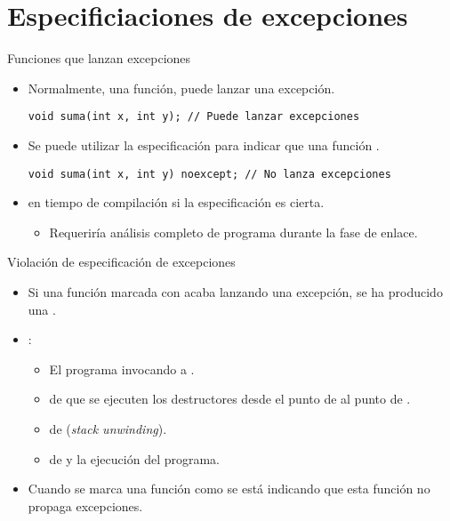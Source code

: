 \section{Especificiaciones de excepciones}

\begin{frame}[t,fragile]{Funciones que lanzan excepciones}
\begin{itemize}
  \item Normalmente, una función, puede lanzar una excepción.
\begin{lstlisting}
void suma(int x, int y); // Puede lanzar excepciones
\end{lstlisting}

  \item Se puede utilizar la especificación  para
        indicar que una función .
\begin{lstlisting}
void suma(int x, int y) noexcept; // No lanza excepciones
\end{lstlisting}

  \item {} en tiempo de compilación 
        si la especificación es cierta.
    \begin{itemize}
      \item Requeriría análisis completo de programa durante la fase de enlace.
    \end{itemize}
\end{itemize}
\end{frame}

\begin{frame}[t,fragile]{Violación de especificación de excepciones}
\begin{itemize}
  \item Si una función marcada con  acaba lanzando una
        excepción, se ha producido una .

  \item {}:
    \begin{itemize}
      \item El programa  invocando a .
      \item {} de que se ejecuten los destructores desde el punto
            de  al punto de .
      \item {} de 
             (\emph{stack unwinding}).
      \item {} de  y 
             la ejecución del programa.
    \end{itemize}

  \item Cuando se marca una función como  se está indicando
        que esta función no propaga excepciones.
\end{itemize}
\end{frame}
